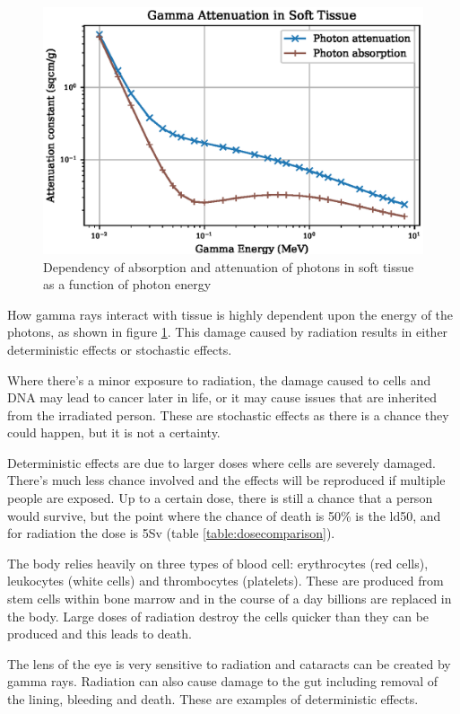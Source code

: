 \begin{figure}[htb]
\centering
\includegraphics[width=0.75\linewidth]{chapters/consequences_of_ionizing_radiation/tissue/soft_tissue_gamma_attenuation.eps}
\caption{Dependency of absorption and attenuation of photons in soft tissue as a function of photon energy}
\label{fig:softtissueattenuation}
\end{figure}

How gamma rays interact with tissue is highly dependent upon the energy of the photons, as shown in figure \ref{fig:softtissueattenuation}.  This damage caused by radiation results in either deterministic effects or stochastic effects.  

Where there's a minor exposure to radiation, the damage caused to cells and DNA may lead to cancer later in life, or it may cause issues that are inherited from the irradiated person.  These are stochastic effects as there is a chance they could happen, but it is not a certainty.

Deterministic effects are due to larger doses where cells are severely damaged.  There's much less chance involved and the effects will be reproduced if multiple people are exposed.  Up to a certain dose, there is still a chance that a person would survive, but the point where the chance of death is 50\% is the \gls{ld50}, and for radiation the dose is 5Sv (table \ref{table:dosecomparison}).

The body relies heavily on three types of blood cell: erythrocytes (red cells), leukocytes (white cells) and thrombocytes (platelets).  These are produced from stem cells within bone marrow and in the course of a day billions are replaced in the body.  Large doses of radiation destroy the cells quicker than they can be produced and this leads to death.  

The lens of the eye is very sensitive to radiation and cataracts can be created by gamma rays.  Radiation can also cause damage to the gut including removal of the lining, bleeding and death.  These are examples of deterministic  effects.

